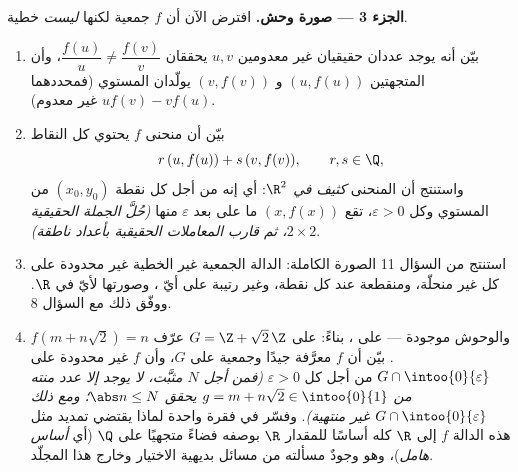 \begin{problem}[{مسألة نهاية الأسبوع --- $f(x + y) = f(x) + f(y)$:
الانتظام يفرض الخطية، وصورة الوحوش}]
\medskip
\noindent\textbf{الجزء 3 --- صورة وحش.} افترض
الآن أن $f$ جمعية لكنها \emph{ليست} خطية.
\begin{enumerate}[resume]
  \item بيّن أنه يوجد عددان حقيقيان غير معدومين $u, v$ يحققان
        $\dfrac{f(u)}{u} \neq \dfrac{f(v)}{v}$، وأن
        المتجهتين $(u, f(u))$ و $(v, f(v))$ يولّدان المستوي (فمحددهما
        $u f(v) - v f(u)$ غير معدوم).
  \item بيّن أن منحنى $f$ يحتوي كل النقاط
        \[
        r\,(u, f(u)) + s\,(v, f(v)), \qquad r, s \in \Q ,
        \]
        واستنتج أن المنحنى \emph{كثيف في $\R^2$}: أي إنه من أجل
        كل نقطة $(x_0, y_0)$ من المستوي وكل
        $\varepsilon > 0$، تقع $(x, f(x))$ ما على بعد
        $\varepsilon$ منها \emph{(حُلَّ الجملة الحقيقية
        $2\times2$، ثم قارب المعاملات الحقيقية بأعداد
        ناطقة)}.
  \item استنتج من السؤال 11 الصورة الكاملة: الدالة الجمعية
        غير الخطية غير محدودة على كل  غير منحلّة،
        ومنقطعة عند كل نقطة، وغير رتيبة على أيّ
        ، وصورتها لأيّ   في
        $\R$. ووفّق ذلك مع السؤال 8.
  \item والوحوش موجودة --- على  ، بناءً:
        على $G = \Z + \sqrt2\,\Z$ عرّف $f(m + n\sqrt2) = n$.
        بيّن أن $f$ معرَّفة جيدًا وجمعية على $G$، وأن
        $f$ غير محدودة على $G \cap \intoo{0}{\varepsilon}$ من أجل
        كل $\varepsilon > 0$ \emph{(فمن أجل $N$ مثبَّت، لا يوجد إلا
        عدد منته من $g = m + n\sqrt2 \in \intoo{0}{1}$ يحقق
        $\abs n \leq N$؛ ومع ذلك $G \cap \intoo{0}{\varepsilon}$
        غير منتهية)}. وفسّر في فقرة واحدة لماذا يقتضي تمديد
        مثل هذه الدالة $f$ إلى $\R$ كله أساسًا للمقدار $\R$ بوصفه
        فضاءً متجهيًا على $\Q$ (أي \emph{أساس هامل})، وهو
        وجودٌ مسألته من مسائل بديهية الاختيار وخارج هذا
        المجلّد.
\end{enumerate}


\end{problem}
